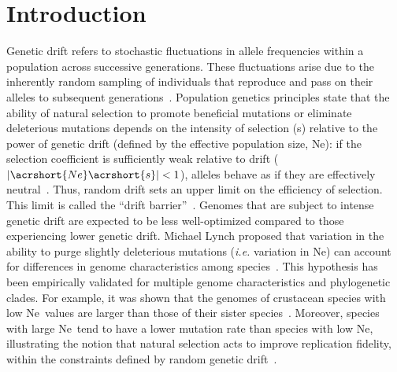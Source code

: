 \section{Introduction}
Genetic drift refers to stochastic fluctuations in allele frequencies within a population across successive generations. These fluctuations arise due to the inherently random sampling of individuals that reproduce and pass on their alleles to subsequent generations~\citep{wright_evolution_1929, graur_fundamentals_2000}. Population genetics principles state that the ability of natural selection to promote beneficial mutations or eliminate deleterious mutations depends on the intensity of selection (\acrshort{s}) relative to the power of genetic drift (defined by the effective population size, \acrshort{Ne}): if the selection coefficient is sufficiently weak relative to drift ($|\acrshort{Ne}\acrshort{s}| < 1 $), alleles behave as if they are effectively neutral~\citep{kimura_mutation_1963, ohta_slightly_1973}. Thus, random drift sets an upper limit on the efficiency of selection. This limit is called the “drift barrier”~\citep{lynch_frailty_2007, lynch_evolution_2010}. 
Genomes that are subject to intense genetic drift are expected to be less well-optimized compared to those experiencing lower genetic drift. Michael Lynch proposed that variation in the ability to purge slightly deleterious mutations (\textit{i.e.} variation in \acrshort{Ne}) can account for differences in genome characteristics among species~\citep{lynch_origins_2003}. This hypothesis has been empirically validated for multiple genome characteristics and phylogenetic clades. For example, it was shown that the genomes of crustacean species with low \acrshort{Ne}~values are larger than those of their sister species~\citep{lefebure_less_2017}. Moreover, species with large \acrshort{Ne}~tend to have a lower mutation rate than species with low \acrshort{Ne}, illustrating the notion that natural selection acts to improve replication fidelity, within the constraints defined by random genetic drift~\citep{lynch_genetic_2016}.

